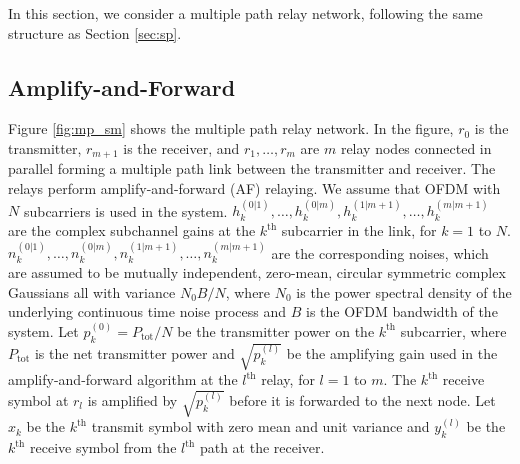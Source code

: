 \documentclass[journal]{IEEEtran}
\begin{document}
In this section, we consider a multiple path relay network, following the same structure as Section \ref{sec:sp}.

\subsection{Amplify-and-Forward}
Figure \ref{fig:mp_sm} shows the multiple path relay network.  In the figure, $r_0$ is the transmitter, $r_{m+1}$ is the receiver, and $r_1, \ldots, r_m$ are $m$ relay nodes connected in parallel forming a multiple path link between the transmitter and receiver.  The relays perform amplify-and-forward (AF) relaying.  We assume that OFDM with $N$ subcarriers is used in the system.  $h_k^{(0|1)}, \ldots, h_k^{(0|m)}, h_k^{(1|m+1)}, \ldots, h_k^{(m|m+1)}$ are the complex subchannel gains at the $k^{\mbox{th}}$ subcarrier in the link, for $k = 1$ to $N$.   $n_k^{(0|1)}, \ldots, n_k^{(0|m)}, n_k^{(1|m+1)}, \ldots, n_k^{(m|m+1)}$ are the corresponding noises, which are assumed to be mutually independent, zero-mean, circular symmetric complex Gaussians all with variance $N_0 B / N$, where $N_0$ is the power spectral density of the underlying continuous time noise process and $B$ is the OFDM bandwidth of the system.  Let $p_k^{(0)} = P_{\mbox{tot}}/N$ be the transmitter power on the $k^{\mbox{th}}$ subcarrier, where $P_{\mbox{tot}}$ is the net transmitter power and $\sqrt{p_k^{(l)}}$ be the amplifying gain used in the amplify-and-forward algorithm at the $l^{\mbox{th}}$ relay, for $l=1$ to $m$.  The $k^{\mbox{th}}$ receive symbol at $r_l$ is amplified by $\sqrt{p_k^{(l)}}$ before it is forwarded to the next node.  Let $x_k$ be the $k^{\mbox{th}}$ transmit symbol with zero mean and unit variance and $y_k^{(l)}$  be the $k^{\mbox{th}}$ receive symbol from the $l^{\mbox{th}}$ path at the receiver.
\end{document}
